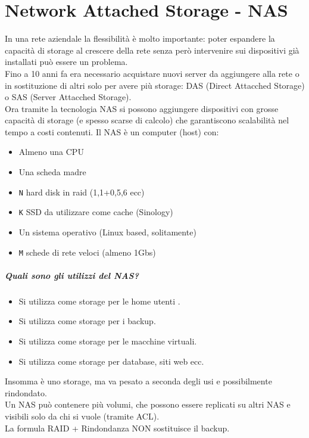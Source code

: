 \documentclass[a4paper]{report}
\begin{document}
\chapter{Network Attached Storage - NAS}
In una rete aziendale la flessibilità è molto importante: poter
espandere la capacità di storage al crescere della rete senza
però intervenire sui dispositivi già installati può essere un
problema.
\\Fino a 10 anni fa era necessario acquistare nuovi server da
aggiungere alla rete o in sostituzione di altri solo per avere più
storage: DAS (Direct Attacched Storage) o SAS (Server
Attacched Storage).
\\Ora tramite la tecnologia NAS si possono aggiungere dispositivi
con grosse capacità di storage (e spesso scarse di calcolo) che
garantiscono scalabilità nel tempo a costi contenuti.
Il NAS è un computer (host) con:
\begin{itemize}
\item Almeno una CPU
\item Una scheda madre
\item \texttt{N} hard disk in raid (1,1+0,5,6 ecc)
\item \texttt{K} SSD da utilizzare come cache (Sinology)
\item Un sistema operativo (Linux based, solitamente)
\item \texttt{M} schede di rete veloci (almeno 1Gbs)
\end{itemize}
\paragraph{Quali sono gli utilizzi del NAS?}
\begin{itemize}
\item Si utilizza come storage per le home utenti .
\item Si utilizza come storage per i backup.
\item Si utilizza come storage per le macchine virtuali.
\item Si utilizza come storage per database, siti web ecc.
\end{itemize}
Insomma è uno storage, ma va pesato a seconda degli usi e
possibilmente rindondato.\\
Un NAS può contenere più volumi, che possono essere
replicati su altri NAS e visibili solo da chi si vuole (tramite ACL).\\
La formula RAID + Rindondanza NON sostituisce il backup.\\
\end{document}
